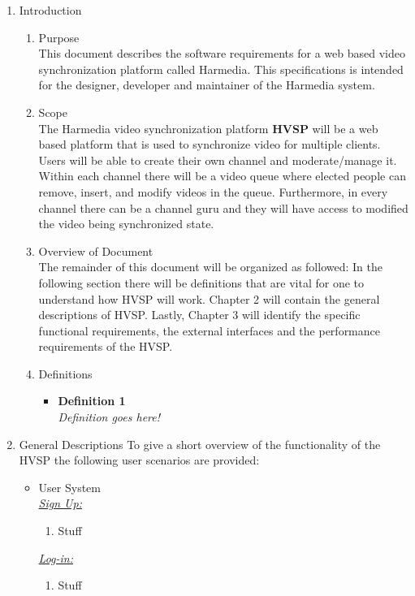 \documentclass[12pt,a4paper,onesie,titlepage,draft]{article}
\begin{document}
\iffalse \begin{enumerate}
	\item Introduction
		\begin{enumerate}
			\item Purpose \\
				This document describes the software requirements for a web based video synchronization platform called Harmedia.  This specifications is intended for the designer, developer and maintainer of the Harmedia system.
			\item Scope \\
				The Harmedia video synchronization platform \textbf{HVSP} will be a web based platform that is used to synchronize video for multiple clients.  Users will be able to create their own channel and moderate/manage it.  Within each channel there will be a video queue where elected people can remove, insert, and modify videos in the queue.  Furthermore, in every channel there can be a channel guru and they will have access to modified the video being synchronized state.
			\item Overview of Document \\
				The remainder of this document will be organized as followed: In the following section there will be definitions that are vital for one to understand how HVSP will work.  Chapter 2 will contain the general descriptions of HVSP.  Lastly, Chapter 3  will identify the specific functional requirements, the external interfaces and the performance requirements of the HVSP.
			\item Definitions
				\begin {itemize}
					\item \textbf{Definition 1} \\
						\textit{Definition goes here!}
				\end {itemize}
		\end{enumerate}
	\item General Descriptions
		To give a short overview of the functionality of the HVSP the following user scenarios are provided:
		\begin{itemize}
			\item User System \\
				\underline{\textit{Sign Up:}}
			\begin{enumerate}
				\item Stuff
			\end{enumerate}
			\underline{\textit{Log-in:}}
			\begin{enumerate}
				\item Stuff

\end{enumerate}
\end{itemize}
\end{enumerate}
\end{document}
